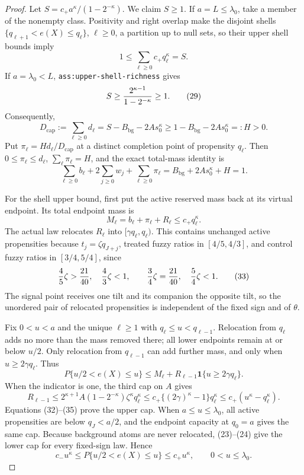 \documentclass{article}
\begin{document}
\begin{proof}
Let \(S=c_+a^\kappa/(1-2^{-\kappa})\).  We claim \(S\geq1\).  If
\(a=L\leq\lambda_0\), take a member of the nonempty class.  Positivity and
right overlap make the disjoint shells
\(\{q_{\ell+1}<e(X)\leq q_\ell\}\), \(\ell\geq0\), a partition up to null
sets, so their upper shell bounds imply
\[
1\leq\sum_{\ell\geq0}c_+q_\ell^\kappa=S.                 \tag{28}
\]
If \(a=\lambda_0<L\), \texttt{ass:upper-shell-richness} gives
\[
S\geq{2^{\kappa-1}\over1-2^{-\kappa}}\geq1.               \tag{29}
\]
Consequently,
\[
D_{\mathrm{cap}}:=\sum_{\ell\geq0}d_\ell
=S-B_{\mathrm{bg}}-2As_0^\kappa
\geq1-B_{\mathrm{bg}}-2As_0^\kappa=:H>0.                 \tag{30}
\]
Put \(\pi_\ell=Hd_\ell/D_{\mathrm{cap}}\) at a distinct completion point of
propensity \(q_\ell\).  Then \(0\leq\pi_\ell\leq d_\ell\),
\(\sum_\ell\pi_\ell=H\), and the exact total-mass identity is
\[
\sum_{\ell\geq0}b_\ell+2\sum_{j\geq0}w_j+
\sum_{\ell\geq0}\pi_\ell
=B_{\mathrm{bg}}+2As_0^\kappa+H=1.                       \tag{31}
\]

For the shell upper bound, first put the active reserved mass back at its
virtual endpoint.  Its total endpoint mass is
\[
M_\ell=b_\ell+\pi_\ell+R_\ell\leq c_+q_\ell^\kappa.       \tag{32}
\]
The actual law relocates \(R_\ell\) into \([\gamma q_\ell,q_\ell)\).  This
contains unchanged active propensities because \(t_j=\zeta q_{J+j}\), treated
fuzzy ratios in \([4/5,4/3]\), and control fuzzy ratios in \([3/4,5/4]\), since
\[
{4\over5}\zeta>{21\over40},\quad {4\over3}\zeta<1,
\quad\quad {3\over4}\zeta={21\over40},\quad {5\over4}\zeta<1. \tag{33}
\]
The signal point receives one tilt and its companion the opposite tilt, so the
unordered pair of relocated propensities is independent of the fixed sign and
of \(\theta\).

Fix \(0<u<a\) and the unique \(\ell\geq1\) with
\(q_\ell\leq u<q_{\ell-1}\).  Relocation from \(q_\ell\) adds no more than
the mass removed there; all lower endpoints remain at or below \(u/2\).  Only
relocation from \(q_{\ell-1}\) can add further mass, and only when
\(u\geq2\gamma q_\ell\).  Thus
\[
P\{u/2<e(X)\leq u\}
\leq M_\ell+R_{\ell-1}\mathbf 1\{u\geq2\gamma q_\ell\}.   \tag{34}
\]
When the indicator is one, the third cap on \(A\) gives
\[
R_{\ell-1}
\leq2^{\kappa+1}A(1-2^{-\kappa})\zeta^\kappa q_\ell^\kappa
\leq c_+\{(2\gamma)^\kappa-1\}q_\ell^\kappa
\leq c_+(u^\kappa-q_\ell^\kappa).                         \tag{35}
\]
Equations (32)--(35) prove the upper cap.  When \(a\leq u\leq\lambda_0\),
all active propensities are below \(q_J<a/2\), and the endpoint capacity at
\(q_0=a\) gives the same cap.  Because background atoms are never relocated,
(23)--(24) give the lower cap for every fixed-sign law.  Hence
\[
c_-u^\kappa\leq P\{u/2<e(X)\leq u\}\leq c_+u^\kappa,
\quad\quad0<u\leq\lambda_0.                                  \tag{36}
\]


\end{proof}
\end{document}
